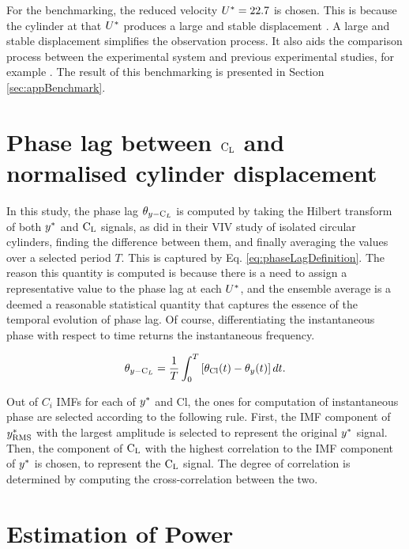 \documentclass[oneside]{utmthesis}
\begin{document}
For the benchmarking, the reduced velocity $U^{*} = 22.7$ is chosen. This is because the cylinder at that $U^{*}$ produces a large and stable displacement \citep{Koide2013}. A large and stable displacement simplifies the observation process. It also aids the comparison process between the experimental system and previous experimental studies, for example \citet{Koide2013}. The result of this benchmarking is presented in Section \ref{sec:appBenchmark}.

\section{Phase lag between $\text{C}_{\text{L}}$ and normalised cylinder displacement} \label{sec:phaseLag90}

In this study, the phase lag $\theta_{y-\text{C}_{L}}$ is computed by taking the Hilbert transform of both $y^{*}$ and $\text{C}_{\text{L}}$ signals, as \citet{Khalak1999} did in their VIV study of isolated circular cylinders, finding the difference between them, and finally averaging the values over a selected period $T$. This is captured by Eq. \ref{eq:phaseLagDefinition}. The reason this quantity is computed is because there is a need to assign a representative value to the phase lag at each $U^{*}$, and the ensemble average is a deemed a reasonable statistical quantity that captures the essence of the temporal evolution of phase lag. Of course, differentiating the instantaneous phase with respect to time returns the instantaneous frequency.

\begin{equation}
  \theta_{y-\text{C}_{L}} = \frac{1}{T} \int_{0}^{T} \left[ \theta_{\text{Cl}}(t) - \theta_{y}(t) \right] dt.
  \label{eq:phaseLagDefinition}
\end{equation}

Out of $C_{i}$ IMFs for each of $y^{*}$ and Cl, the ones for computation of instantaneous phase are selected according to the following rule. First, the IMF component of $y^{*}_{\text{RMS}}$ with the largest \rms{} amplitude is selected to represent the original $y^{*}$ signal. Then, the component of $\text{C}_{\text{L}}$ with the highest correlation to the IMF component of $y^{*}$ is chosen, to represent the $\text{C}_{\text{L}}$ signal. The degree of correlation is determined by computing the cross-correlation between the two.

\section{Estimation of Power} \label{sec:estimationOfPower}
\end{document}

